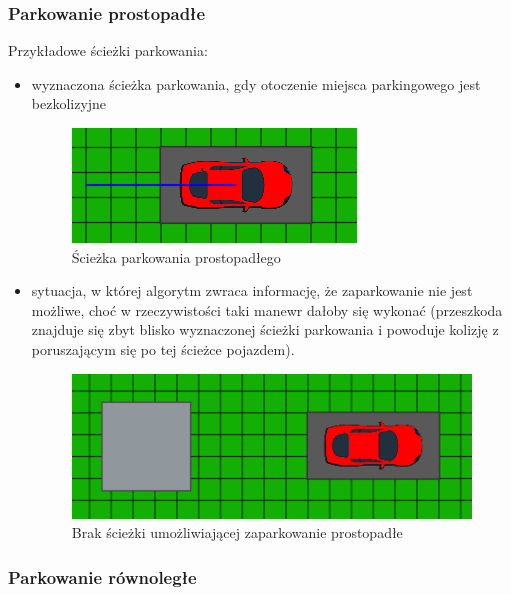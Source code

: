 \documentclass[a4paper,11pt,twoside]{report}
\theoremstyle{definition}
\begin{document}
\subsubsection{Parkowanie prostopadłe}

Przykładowe ścieżki parkowania:
\begin{itemize}
	\item wyznaczona ścieżka parkowania, gdy otoczenie miejsca parkingowego jest bezkolizyjne
	\begin{figure}[h!]
\centering
\includegraphics[scale=1.0]{parkingPathPerpendicular1}
\caption[Ścieżka parkowania prostopadłego]{Ścieżka parkowania prostopadłego}
\end{figure}
	\item sytuacja, w której algorytm zwraca informację, że zaparkowanie nie jest możliwe, choć w rzeczywistości taki manewr dałoby się wykonać (przeszkoda znajduje się zbyt blisko wyznaczonej ścieżki parkowania i powoduje kolizję z poruszającym się po tej ścieżce pojazdem).
	\begin{figure}[h!]
\centering
\includegraphics[scale=0.73]{parkingPathPerpendicular2}
\caption[Brak ścieżki umożliwiającej zaparkowanie prostopadłe]{Brak ścieżki umożliwiającej zaparkowanie prostopadłe}
\end{figure}
\end{itemize}

\subsubsection{Parkowanie równoległe}
\end{document}
